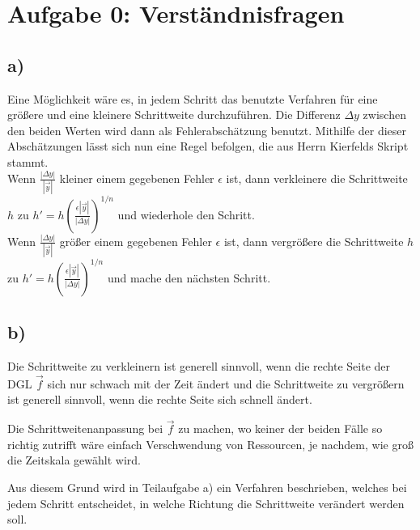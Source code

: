 \setcounter{secnumdepth}{0}
\section{Aufgabe 0: Verständnisfragen}
\label{sec:auf0}
\subsection*{a)}
    Eine Möglichkeit wäre es, in jedem Schritt das benutzte Verfahren für eine größere und eine kleinere Schrittweite durchzuführen.
    Die Differenz $\Delta y$ zwischen den beiden Werten wird dann als Fehlerabschätzung benutzt.
    Mithilfe der dieser Abschätzungen lässt sich nun eine Regel befolgen, die aus Herrn Kierfelds Skript stammt. \\[0.5cm]

    Wenn $\frac{|\Delta y|}{|\vec{y}|}$ kleiner einem gegebenen Fehler $\epsilon$ ist, dann verkleinere die Schrittweite $h$ zu $h' = h \left(\frac{\epsilon |\vec{y}|}{|\Delta y|}\right)^{1/n}$ und wiederhole den Schritt. \\[0.5cm]

    Wenn $\frac{|\Delta y|}{|\vec{y}|}$ größer einem gegebenen Fehler $\epsilon$ ist, dann vergrößere die Schrittweite $h$ zu $h' = h \left(\frac{\epsilon |\vec{y}|}{|\Delta y|}\right)^{1/n}$ und mache den nächsten Schritt.
    

\subsection*{b)}
    Die Schrittweite zu verkleinern ist generell sinnvoll, wenn die rechte Seite der DGL $\vec{f}$ sich nur schwach mit der Zeit ändert und die Schrittweite zu vergrößern ist generell sinnvoll, wenn die rechte Seite sich schnell ändert.

    Die Schrittweitenanpassung bei $\vec{f}$ zu machen, wo keiner der beiden Fälle so richtig zutrifft wäre einfach Verschwendung von Ressourcen, je nachdem, wie groß die Zeitskala gewählt wird.

    Aus diesem Grund wird in Teilaufgabe a) ein Verfahren beschrieben, welches bei jedem Schritt entscheidet, in welche Richtung die Schrittweite verändert werden soll.
